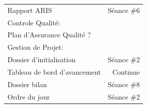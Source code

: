 \documentclass[]{scrartcl}
\begin{document}
\begin{itemize}
\begin{table}[h!]
\begin{tabular}{l r}
       \hspace{0.66cm}  Rapport ARIS & Séance \#6\\
         \hspace{0.33cm}   Controle Qualité: & \\
                \hspace{0.66cm} Plan d'Assurance Qualité ?\\ 
                \midrule
                Gestion de Projet: &\\
                \midrule
			\hspace{0.33cm}   Dossier d'initialisation & Séance \#2\\
			\hspace{0.33cm}   Tableau de bord d'avancement & Continue\\
			\hspace{0.33cm}   Dossier bilan & Séance \#8\\
			\hspace{0.33cm}   Ordre du jour  & Séance \#2\\
        \midrule%
        \bottomrule%
   \end{tabular}%
   \label{tab:sample_label}%
   \end{table}

\end{itemize}
\end{document}
